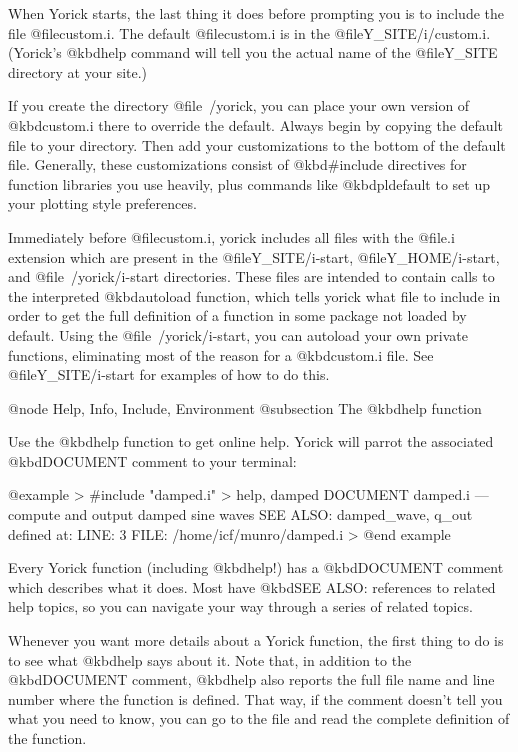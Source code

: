 {When Yorick starts, the last thing it does before prompting you is to
include the file @file{custom.i}.  The default @file{custom.i} is in the
@file{Y_SITE/i/custom.i}.  (Yorick's @kbd{help} command will tell
you the actual name of the @file{Y_SITE} directory at your site.)

If you create the directory @file{~/yorick}, you can place your own
version of @kbd{custom.i} there to override the default.  Always begin
by copying the default file to your directory.  Then add your
customizations to the bottom of the default file.  Generally, these
customizations consist of @kbd{#include} directives for function libraries
you use heavily, plus commands like @kbd{pldefault} to set up your
plotting style preferences.

Immediately before @file{custom.i}, yorick includes all files with the
@file{.i} extension which are present in the @file{Y_SITE/i-start},
@file{Y_HOME/i-start}, and @file{~/yorick/i-start} directories.  These
files are intended to contain calls to the interpreted @kbd{autoload}
function, which tells yorick what file to include in order to get the
full definition of a function in some package not loaded by default.
Using the @file{~/yorick/i-start}, you can autoload your own private
functions, eliminating most of the reason for a @kbd{custom.i} file.
See @file{Y_SITE/i-start} for examples of how to do this.


@node Help, Info, Include, Environment
@subsection The @kbd{help} function

Use the @kbd{help} function to get online help.  Yorick will parrot
the associated @kbd{DOCUMENT} comment to your terminal:

@example
> #include "damped.i"
> help, damped
  DOCUMENT damped.i --- compute and output damped sine waves
  SEE ALSO: damped_wave, q_out
defined at:   LINE: 3  FILE: /home/icf/munro/damped.i
>
@end example

Every Yorick function (including @kbd{help}!) has a @kbd{DOCUMENT}
comment which describes what it does.  Most have @kbd{SEE ALSO:}
references to related help topics, so you can navigate your way
through a series of related topics.

Whenever you want more details about a Yorick function, the first
thing to do is to see what @kbd{help} says about it.  Note that, in
addition to the @kbd{DOCUMENT} comment, @kbd{help} also reports the
full file name and line number where the function is defined.  That
way, if the comment doesn't tell you what you need to know, you can
go to the file and read the complete definition of the function.

}
